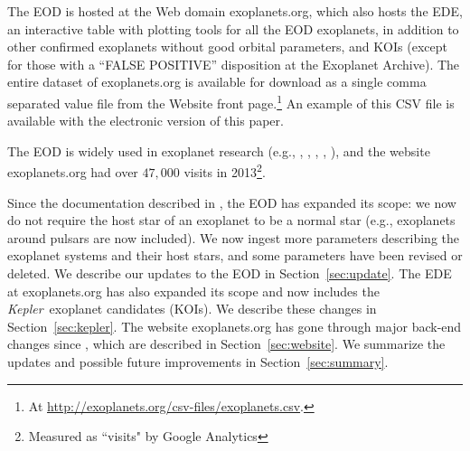 \documentclass[11pt,preprint]{aastex}
\def\kepler{\textit{Kepler}}
\begin{document}
\begin{CJK*}{UTF8}{gbsn}
The EOD is hosted at the Web domain exoplanets.org, which also hosts the EDE, an
interactive table with plotting tools for all the EOD exoplanets, in
addition to other confirmed exoplanets without good orbital
parameters, and KOIs (except for those with a ``FALSE POSITIVE''
disposition at the Exoplanet Archive). The entire dataset of exoplanets.org is available for download as a single comma separated value file from the Website front page.\footnote{At
  \url{http://exoplanets.org/csv-files/exoplanets.csv}.}  An example
of this CSV file is available with the electronic version of this paper.

The EOD is widely
used in exoplanet research (e.g., \citealt{Dawson2013},
\citealt{Howard2013}, \citealt{Kipping2013}, \citealt{Kane2014},
\citealt{Weiss2014}), and the website exoplanets.org had over $47,000$ visits in
2013\footnote{Measured as ``visits" by Google Analytics}.

Since the documentation described in \cite{Wright2011}, the EOD has expanded its scope: we now do
not require the host star of an exoplanet to be a normal star (e.g.,
exoplanets around pulsars are now included). We now ingest more
parameters describing the exoplanet systems and their host stars, and some
parameters have been revised or deleted. We describe our updates to the
EOD in Section~\ref{sec:update}. The EDE at exoplanets.org has also
expanded its scope and now includes the \kepler\ exoplanet candidates
(KOIs). We describe these changes in Section~\ref{sec:kepler}. The
website exoplanets.org has gone through major back-end changes since
\cite{Wright2011}, which are described in Section~\ref{sec:website}. We
summarize the updates and possible future improvements in
Section~\ref{sec:summary}. 

\end{CJK*}
\end{document}
